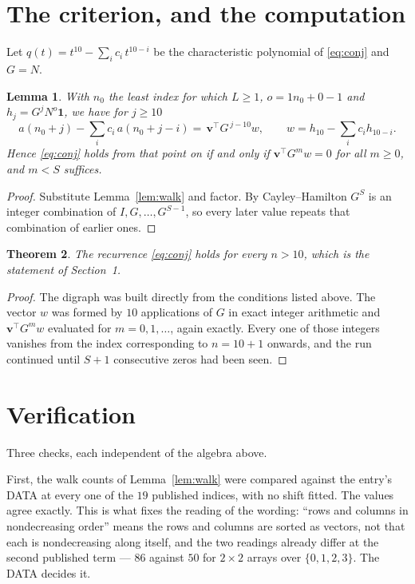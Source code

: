 \documentclass[11pt,a4paper]{article}
\theoremstyle{plain}
\newtheorem{theorem}{Theorem}
\newtheorem{lemma}[theorem]{Lemma}
\theoremstyle{definition}
\begin{document}
\section{The criterion, and the computation}

Let $q(t)=t^{10}-\sum_i c_i\,t^{10-i}$ be the characteristic polynomial of
\eqref{eq:conj} and $G=N$.

\begin{lemma}\label{lem:crit}
With $n_0$ the least index for which $L\ge1$, $o=1n_0+0-1$ and
$h_j=G^{j}N^{o}\mathbf{1}$, we have for $j\ge10$
\[
a(n_0+j)-\sum_i c_i\,a(n_0+j-i)=\,\mathbf{v}^{\!\top}G^{\,j-10}w,
\qquad w=h_{10}-\sum_i c_ih_{10-i} .
\]
Hence \eqref{eq:conj} holds from that point on if and only if
$\mathbf{v}^{\!\top}G^{m}w=0$ for all $m\ge0$, and $m<S$ suffices.
\end{lemma}

\begin{proof}
Substitute Lemma~\ref{lem:walk} and factor. By Cayley--Hamilton $G^{S}$ is an integer
combination of $I,G,\dots,G^{S-1}$, so every later value repeats that combination of
earlier ones.
\end{proof}

\begin{theorem}
The recurrence \eqref{eq:conj} holds for every $n>10$, which is the statement of
Section~1.
\end{theorem}

\begin{proof}
The digraph was built directly from the conditions listed above. The vector $w$ was formed by
$10$ applications of $G$ in exact integer arithmetic and $\mathbf{v}^{\!\top}G^{m}w$
evaluated for $m=0,1,\dots$, again exactly. Every one of those integers vanishes from the
index corresponding to $n=10+1$ onwards, and the run continued until $S+1$ consecutive
zeros had been seen.
\end{proof}

\section{Verification}

Three checks, each independent of the algebra above.

First, the walk counts of Lemma~\ref{lem:walk} were compared against the entry's DATA at
every one of the $19$ published indices, with no shift fitted. The values agree exactly.
This is what fixes the reading of the wording: ``rows and columns in nondecreasing order''
means the rows and columns are sorted as vectors, not that each is nondecreasing along
itself, and the two readings already differ at the second published term --- $86$ against
$50$ for $2\times2$ arrays over $\{0,1,2,3\}$. The DATA decides it.
\end{document}
